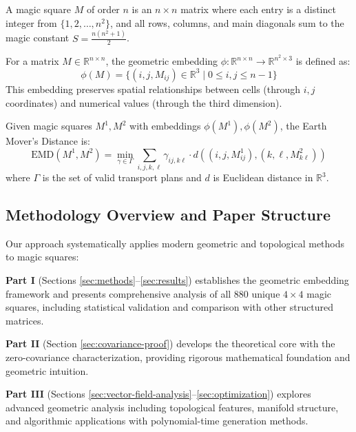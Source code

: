 \begin{definition}
A magic square $M$ of order $n$ is an $n \times n$ matrix where each entry is a distinct integer from $\{1, 2, \ldots, n^2\}$, and all rows, columns, and main diagonals sum to the magic constant $S = \frac{n(n^2+1)}{2}$.
\end{definition}

\begin{definition}
For a matrix $M \in \mathbb{R}^{n \times n}$, the geometric embedding $\phi: \mathbb{R}^{n \times n} \rightarrow \mathbb{R}^{n^2 \times 3}$ is defined as:
$$\phi(M) = \{(i, j, M_{ij}) \in \mathbb{R}^3 \mid 0 \leq i, j \leq n-1\}$$
This embedding preserves spatial relationships between cells (through $i,j$ coordinates) and numerical values (through the third dimension).
\end{definition}

\begin{definition}
Given magic squares $M^1, M^2$ with embeddings $\phi(M^1), \phi(M^2)$, the Earth Mover's Distance is:
$$\text{EMD}(M^1, M^2) = \min_{\gamma \in \Gamma} \sum_{i,j,k,\ell} \gamma_{ij,k\ell} \cdot d((i,j,M^1_{ij}), (k,\ell,M^2_{k\ell}))$$
where $\Gamma$ is the set of valid transport plans and $d$ is Euclidean distance in $\mathbb{R}^3$.
\end{definition}

\subsection{Methodology Overview and Paper Structure}

Our approach systematically applies modern geometric and topological methods to magic squares:

\textbf{Part I} (Sections \ref{sec:methods}--\ref{sec:results}) establishes the geometric embedding framework and presents comprehensive analysis of all 880 unique $4 \times 4$ magic squares, including statistical validation and comparison with other structured matrices.

\textbf{Part II} (Section \ref{sec:covariance-proof}) develops the theoretical core with the zero-covariance characterization, providing rigorous mathematical foundation and geometric intuition.

\textbf{Part III} (Sections \ref{sec:vector-field-analysis}--\ref{sec:optimization}) explores advanced geometric analysis including topological features, manifold structure, and algorithmic applications with polynomial-time generation methods.

